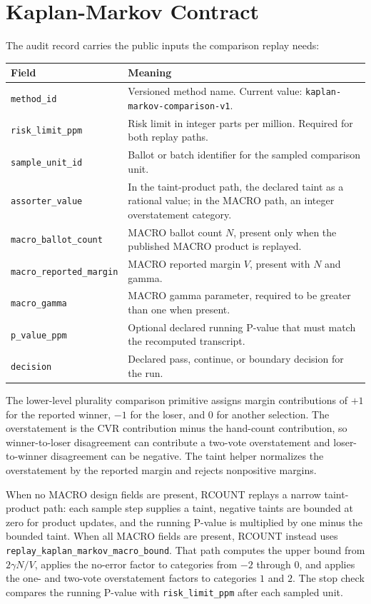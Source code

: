 \section{Kaplan-Markov Contract}

The audit record carries the public inputs the comparison replay needs:

\begin{center}
\small
\begin{tabularx}{\textwidth}{lX}
\toprule
Field & Meaning \\
\midrule
\texttt{method\_id} & Versioned method name. Current value: \texttt{kaplan-markov-comparison-v1}. \\
\texttt{risk\_limit\_ppm} & Risk limit in integer parts per million. Required for both replay paths. \\
\texttt{sample\_unit\_id} & Ballot or batch identifier for the sampled comparison unit. \\
\texttt{assorter\_value} & In the taint-product path, the declared taint as a rational value; in the MACRO path, an integer overstatement category. \\
\texttt{macro\_ballot\_count} & MACRO ballot count $N$, present only when the published MACRO product is replayed. \\
\texttt{macro\_reported\_margin} & MACRO reported margin $V$, present with $N$ and gamma. \\
\texttt{macro\_gamma} & MACRO gamma parameter, required to be greater than one when present. \\
\texttt{p\_value\_ppm} & Optional declared running P-value that must match the recomputed transcript. \\
\texttt{decision} & Declared pass, continue, or boundary decision for the run. \\
\bottomrule
\end{tabularx}
\end{center}

The lower-level plurality comparison primitive assigns margin contributions of
$+1$ for the reported winner, $-1$ for the loser, and $0$ for another selection.
The overstatement is the CVR contribution minus the hand-count contribution, so
winner-to-loser disagreement can contribute a two-vote overstatement and
loser-to-winner disagreement can be negative. The taint helper normalizes the
overstatement by the reported margin and rejects nonpositive margins.

When no MACRO design fields are present, RCOUNT replays a narrow taint-product
path: each sample step supplies a taint, negative taints are bounded at zero for
product updates, and the running P-value is multiplied by one minus the bounded
taint. When all MACRO fields are present, RCOUNT instead uses
\texttt{replay\_kaplan\_markov\_macro\_bound}. That path computes the upper
bound from $2\gamma N/V$, applies the no-error factor to categories from $-2$
through $0$, and applies the one- and two-vote overstatement factors to
categories $1$ and $2$. The stop check compares the running P-value with
\texttt{risk\_limit\_ppm} after each sampled unit.
